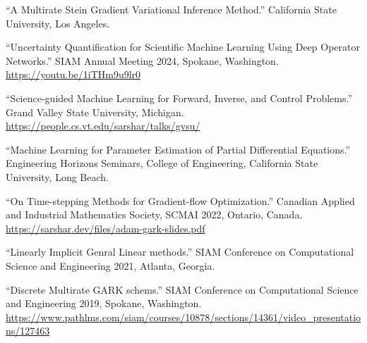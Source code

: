 \documentclass[11pt,letterpaper]{report}
\begin{document}
    \begin{tablist}

        \item[2025] \tab{}\enquote{A Multirate Stein Gradient Variational Inference Method.} California State University, Los Angeles.

        \item[2024] \tab{}\enquote{Uncertainty Quantification for Scientific Machine Learning Using Deep Operator Networks.}
        SIAM Annual Meeting 2024, Spokane, Washington.
        \href{https://youtu.be/1iTHm9u9lr0?feature=shared}{https://youtu.be/1iTHm9u9lr0}

        \item[2023] \tab{}\enquote{Science-guided Machine Learning for Forward, Inverse, and Control Problems.}
        Grand Valley State University, Michigan.
        \href{https://people.cs.vt.edu/sarshar/talks/gvsu/}{https://people.cs.vt.edu/sarshar/talks/gvsu/}

        \item[2023] \tab{}\enquote{Machine Learning for Parameter Estimation of Partial Differential Equations.} Engineering Horizons Seminars, College of Engineering, California State University, Long Beach.
   
        \item[2022] \tab{}\enquote{On Time-stepping Methods for Gradient-flow Optimization.} 
        Canadian Applied and Industrial Mathematics Society, SCMAI 2022, Ontario, Canada.
        \href{https://sarshar.dev/files/adam-gark-slides.pdf}{https://sarshar.dev/files/adam-gark-slides.pdf}

        \item[2020] \tab{}\enquote{Linearly Implicit Genral Linear methods.} SIAM Conference on Computational Science and Engineering 2021, Atlanta, Georgia. 

        \item[2019] \tab{}\enquote{Discrete Multirate GARK schems.}
        SIAM Conference on Computational Science and Engineering 2019, Spokane, Washington.
        \href{https://www.pathlms.com/siam/courses/10878/sections/14361/video\_presentations/127463}{https://www.pathlms.com/siam/courses/10878/sections/14361/video\_presentations/127463}

    \end{tablist}

\end{document}
